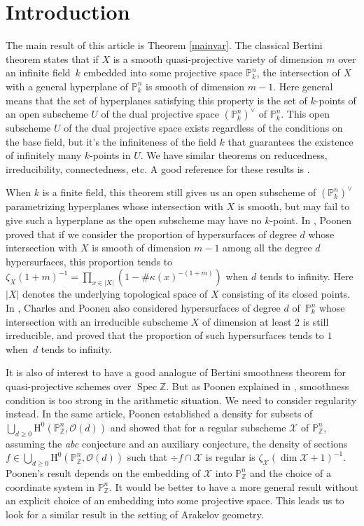 \documentclass[JEP,XML,SOM,Unicode,published]{cedram}
\theoremstyle{plain}
\theoremstyle{definition}
\newcommand{\ho}{\mathrm{H}}
\newcommand{\X}{\mathcal{X}}
\newcommand{\Z}{\mathbb{Z}}
\newcommand{\pr}{\mathbb{P}}
\DeclareMathOperator{\Spec}{Spec}
\begin{document}
\section{Introduction}
The main result of this article is Theorem \ref{mainvar}.
The classical Bertini theorem states that if $X$ is a smooth quasi-projective variety of dimension $m$ over an infinite field~$k$ embedded into some projective space $\pr^n_k$, the intersection of $X$ with a general hyper\-plane of $\pr^n_k$ is smooth of dimension $m-1$. Here general means that the set of hyper\-planes satisfying this property is the set of $k$-points of an open subscheme $U$ of the dual projective space $(\pr^n_k)^{\vee}$ of $\pr^n_k$.
This open subscheme $U$ of the dual projective space exists regardless of the conditions on the base field, but it's the infiniteness of the field $k$ that guarantees the existence of infinitely many $k$-points in $U$. We have similar theorems on reducedness, irreducibility, connectedness, etc. A good reference for these results is \cite{Jo83}.

When $k$ is a finite field, this theorem still gives us an open subscheme of $(\pr^n_k)^{\vee}$ parametrizing hyperplanes whose intersection with $X$ is smooth, but may fail to give such a hyperplane as the open subscheme may have no $k$-point. In \cite{Po04}, Poonen proved that if we consider the proportion of hypersurfaces of degree $d$ whose intersection with $X$ is smooth of dimension $m-1$ among all the degree $d$ hypersurfaces, this proportion tends to $\zeta_X(1+m)^{-1}=\prod_{x\in |X|}(1-\#\kappa(x)^{-(1+m)})$ when $d$ tends to infinity. Here $|X|$ denotes the underlying topological space of $X$ consisting of its closed points. In \cite{CP16}, Charles and Poonen also considered hypersurfaces of degree $d$ of~$\pr^n_k$ whose intersection with an irreducible subscheme $X$ of dimension at least $2$ is still irreducible, and proved that the proportion of such hypersurfaces tends to $1$ when~$d$ tends to infinity.

It is also of interest to have a good analogue of Bertini smoothness theorem for quasi-projective schemes over $\Spec \Z$. But as Poonen explained in \cite[\S 5.7]{Po04}, smoothness condition is too strong in the arithmetic situation. We need to consider regularity instead.
In the same article, Poonen established a density for subsets of $\bigcup_{d\geq 0}\ho^0(\pr^n_{\Z}, \mathcal{O}(d))$ and showed that for a regular subscheme $\X$ of $\pr^n_{\Z}$, assum\-ing the \emph{abc} conjecture and an auxiliary conjecture, the density of sections $f\in\bigcup_{d\geq 0}\ho^0(\pr^n_{\Z}, \mathcal{O}(d))$ such that $\div f\cap \X$ is regular is $\zeta_{\X}(\dim \X+1)^{-1}$. Poonen's result depends on the embedding of $\X$ into $\pr^n_{\Z}$ and the choice of a coordinate system in $\pr^n_{\Z}$. It would be better to have a more general result without an explicit choice of an embedding into some projective space. This leads us to look for a similar result in the setting of Arakelov geometry.
\end{document}
